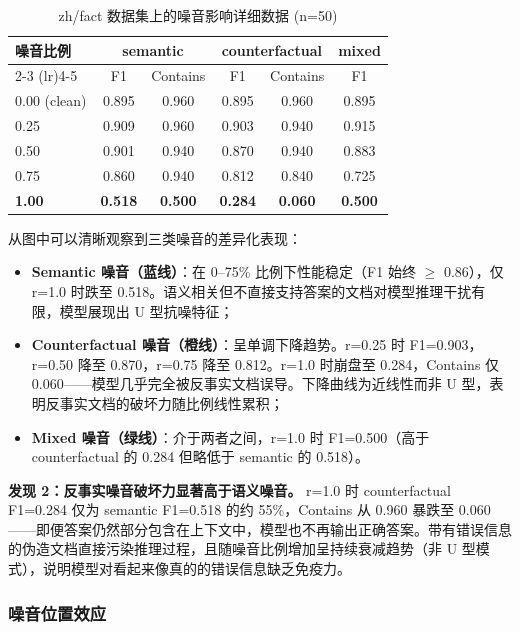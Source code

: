 \documentclass[UTF8,zihao=-4]{ctexart}
\begin{document}
\begin{table}[H]
  \centering
  \caption{zh/fact 数据集上的噪音影响详细数据 (n=50)}
  \begin{tabular}{lccccc}
    \toprule
    噪音比例 & \multicolumn{2}{c}{semantic} & \multicolumn{2}{c}{counterfactual} & mixed \\
    \cmidrule(lr){2-3} \cmidrule(lr){4-5}
    & F1 & Contains & F1 & Contains & F1 \\
    \midrule
    0.00 (clean) & 0.895 & 0.960 & 0.895 & 0.960 & 0.895 \\
    0.25 & 0.909 & 0.960 & 0.903 & 0.940 & 0.915 \\
    0.50 & 0.901 & 0.940 & 0.870 & 0.940 & 0.883 \\
    0.75 & 0.860 & 0.940 & 0.812 & 0.840 & 0.725 \\
    \textbf{1.00} & \textbf{0.518} & \textbf{0.500} & \textbf{0.284} & \textbf{0.060} & \textbf{0.500} \\
    \bottomrule
  \end{tabular}
\end{table}

从图中可以清晰观察到三类噪音的差异化表现：
\begin{itemize}
  \item \textbf{Semantic 噪音（蓝线）}：在 0--75\% 比例下性能稳定（F1 始终 $\ge$ 0.86），仅 r=1.0 时跌至 0.518。语义相关但不直接支持答案的文档对模型推理干扰有限，模型展现出 U 型抗噪特征；
  \item \textbf{Counterfactual 噪音（橙线）}：呈单调下降趋势。r=0.25 时 F1=0.903，r=0.50 降至 0.870，r=0.75 降至 0.812。r=1.0 时崩盘至 0.284，Contains 仅 0.060——模型几乎完全被反事实文档误导。下降曲线为近线性而非 U 型，表明反事实文档的破坏力随比例线性累积；
  \item \textbf{Mixed 噪音（绿线）}：介于两者之间，r=1.0 时 F1=0.500（高于 counterfactual 的 0.284 但略低于 semantic 的 0.518）。
\end{itemize}

\textbf{发现 2：反事实噪音破坏力显著高于语义噪音。} r=1.0 时 counterfactual F1=0.284 仅为 semantic F1=0.518 的约 55\%，Contains 从 0.960 暴跌至 0.060——即便答案仍然部分包含在上下文中，模型也不再输出正确答案。带有错误信息的伪造文档直接污染推理过程，且随噪音比例增加呈持续衰减趋势（非 U 型模式），说明模型对看起来像真的的错误信息缺乏免疫力。

\subsubsection{噪音位置效应}
\end{document}
